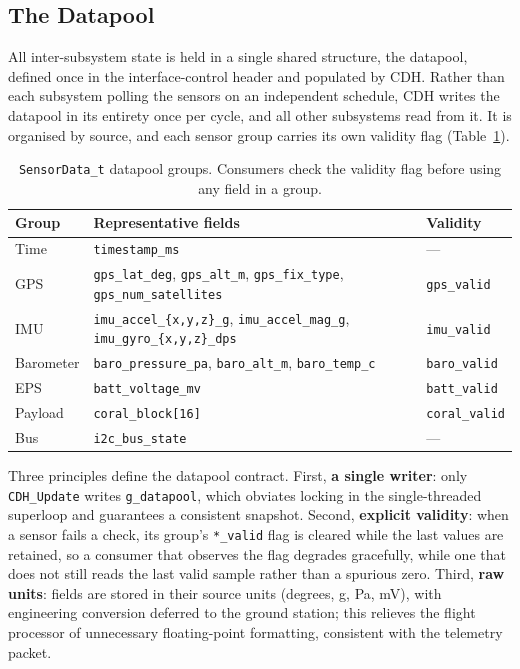 \subsection{The Datapool}
\label{sec:cdh-datapool}

All inter-subsystem state is held in a single shared structure, the
datapool, defined once in the interface-control header and populated by CDH.
Rather than each subsystem polling the sensors on an independent schedule,
CDH writes the datapool in its entirety once per cycle, and all other
subsystems read from it. It is organised by source, and each sensor group
carries its own validity flag (Table~\ref{tab:cdh-datapool}).

\begin{table}[H]
\centering
\begin{tabular}{p{2.1cm}p{8.9cm}p{2.6cm}}
\toprule
\textbf{Group} & \textbf{Representative fields} & \textbf{Validity} \\
\midrule
Time & \texttt{timestamp\_ms} & --- \\
GPS & \texttt{gps\_lat\_deg}, \texttt{gps\_alt\_m}, \texttt{gps\_fix\_type}, \texttt{gps\_num\_satellites} & \texttt{gps\_valid} \\
IMU & \texttt{imu\_accel\_\{x,y,z\}\_g}, \texttt{imu\_accel\_mag\_g}, \texttt{imu\_gyro\_\{x,y,z\}\_dps} & \texttt{imu\_valid} \\
Barometer & \texttt{baro\_pressure\_pa}, \texttt{baro\_alt\_m}, \texttt{baro\_temp\_c} & \texttt{baro\_valid} \\
EPS & \texttt{batt\_voltage\_mv} & \texttt{batt\_valid} \\
Payload & \texttt{coral\_block[16]} & \texttt{coral\_valid} \\
Bus & \texttt{i2c\_bus\_state} & --- \\
\bottomrule
\end{tabular}
\caption{\texttt{SensorData\_t} datapool groups. Consumers check the
validity flag before using any field in a group.}
\label{tab:cdh-datapool}
\end{table}

Three principles define the datapool contract. First, \textbf{a single
writer}: only \texttt{CDH\_Update} writes \texttt{g\_datapool}, which
obviates locking in the single-threaded superloop and guarantees a
consistent snapshot. Second, \textbf{explicit validity}: when a sensor
fails a check, its group's \texttt{*\_valid} flag is cleared while the last
values are retained, so a consumer that observes the flag degrades
gracefully, while one that does not still reads the last valid sample
rather than a spurious zero. Third, \textbf{raw units}: fields are stored
in their source units (degrees, g, Pa, mV), with engineering conversion
deferred to the ground station; this relieves the flight processor of
unnecessary floating-point formatting, consistent with the telemetry
packet.

